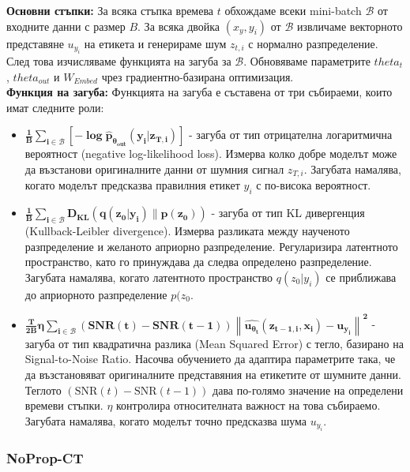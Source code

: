\documentclass[a4paper,11pt]{article}
\begin{document}
\textbf{Основни стъпки:}
За всяка стъпка времева \(t\) обхождаме всеки mini-batch \(\mathcal{B}\) от входните данни с размер \(B\). За всяка двойка \((x_{y}, y_{i})\) от \(\mathcal{B}\) извличаме векторното представяне \(u_{y_{i}}\) на етикета и генерираме шум \(z_{t, i}\) с нормално разпределение. След това изчисляваме функцията на загуба за \(\mathcal{B}\). Обновяваме параметрите \(theta_{t}\), \(theta_{out}\) и \(W_{Embed}\) чрез градиентно-базирана оптимизация. \\

\textbf{Функция на загуба:}
Функцията на загуба е съставена от три събираеми, които имат следните роли:
\begin{itemize}
    \item $\mathbf{\frac{1}{B} \sum\limits_{i\in\mathcal{B}}{\left[ -\log \hat{p}_{\theta_{\text{out}}}(y_i | z_{T,i}) \right]}}$ - загуба от тип отрицателна логаритмична вероятност (negative log-likelihood loss). Измерва колко добре моделът може да възстанови оригиналните данни от шумния сигнал \(z_{T,i}\). Загубата намалява, когато моделът предсказва правилния етикет \(y_{i}\) с по-висока вероятност.
    \item $\mathbf{\frac{1}{B}\sum\limits_{i \in \mathcal{B}} D_{\text{KL}}(q(z_0|y_i) \| p(z_0))}$ - загуба от тип KL дивергенция (Kullback-Leibler divergence). Измерва разликата между наученото разпределение и желаното априорно разпределение. Регуларизира латентното пространство, като го принуждава да следва определено разпределение. Загубата намалява, когато латентното пространство \(q(z_0|y_i)\) се приближава до априорното разпределение \(p(z_0\).
    \item $\mathbf{\frac{T}{2B} \eta \sum\limits_{i \in \mathcal{B}} (\text{SNR}(t) - \text{SNR}(t-1)) \left\| \hat{u_{\theta_t}}(z_{t-1,i}, x_i) - u_{y_i} \right\|^2}$ - загуба от тип квадратична разлика (Mean Squared Error) с тегло, базирано на Signal-to-Noise Ratio. Насочва обучението да адаптира параметрите така, че да възстановяват оригиналните представяния на етикетите от шумните данни. Теглото \((\text{SNR}(t) - \text{SNR}(t-1))\) дава по-голямо значение на определени времеви стъпки. \(\eta\) контролира относителната важност на това събираемо. Загубата намалява, когато моделът точно предсказва шума \(u_{y_{i}}\).
\end{itemize}

\subsubsection{NoProp-CT}
\end{document}
